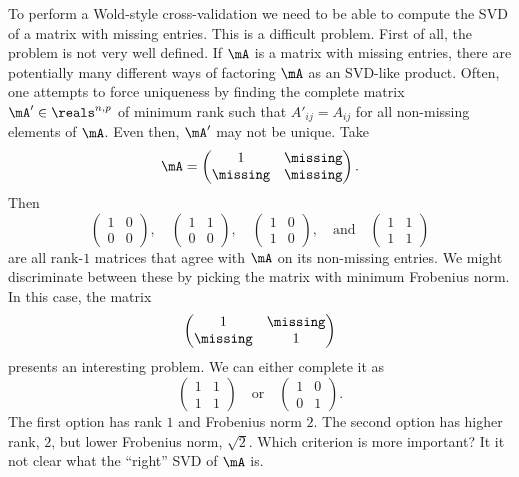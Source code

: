 To perform a Wold-style cross-validation we need to be able to compute the SVD of a matrix with missing entries.  This is a difficult problem.  First of all, the problem is not very well defined.  If $\mA$ is a matrix with missing entries, there are potentially many different ways of factoring $\mA$ as an SVD-like product.  Often, one attempts to force uniqueness by finding the complete matrix $\mA' \in \reals^{n,p}$ of minimum rank such that $A'_{ij} = A_{ij}$ for all non-missing elements of $\mA$.  Even then, $\mA'$ may not be unique.  Take
\[
    \mA
    =
    \left(
    \begin{matrix}
        1        & \missing \\
        \missing & \missing
    \end{matrix}
    \right).
\]
Then
\[
    \left(
    \begin{matrix}
        1 & 0 \\
        0 & 0
    \end{matrix}
    \right),
    \quad
    \left(
    \begin{matrix}
        1 & 1 \\
        0 & 0
    \end{matrix}
    \right),
    \quad
    \left(
    \begin{matrix}
        1 & 0 \\
        1 & 0
    \end{matrix}
    \right),
    \quad
    \text{and}
    \quad
    \left(
    \begin{matrix}
        1 & 1 \\
        1 & 1
    \end{matrix}
    \right)
\]
are all rank-$1$ matrices that agree with $\mA$ on its non-missing entries.  We might discriminate between these by picking the matrix with minimum Frobenius norm.  In this case, the matrix
\[
    \left(
    \begin{matrix}
        1 & \missing \\
        \missing & 1
    \end{matrix}
    \right)
\]
presents an interesting problem.  We can either complete it as
\[
    \left(
    \begin{matrix}
        1 & 1 \\
        1 & 1
    \end{matrix}
    \right)
    \quad
    \text{or}
    \quad
    \left(
    \begin{matrix}
        1 & 0 \\
        0 & 1
    \end{matrix}
    \right).
\]
The first option has rank $1$ and Frobenius norm $2$.  The second option
has higher rank, $2$, but lower Frobenius norm, $\sqrt{2}$.  Which criterion 
is more important?  It it not clear what the ``right'' SVD of $\mA$ is.

